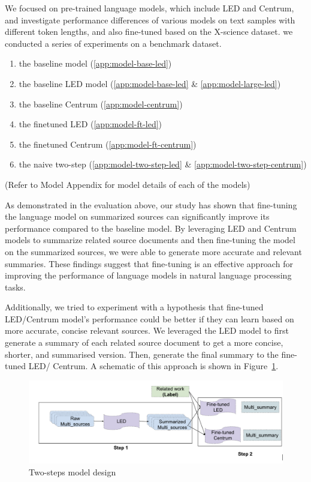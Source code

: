 \documentclass[12pt, twocolumn]{article}
\numberwithin{equation}{section}
\begin{document}
We focused on pre-trained language models, which include LED and Centrum, and investigate performance differences of various models on text samples with different token lengths, and also fine-tuned based on the X-science dataset.  we conducted a series of experiments on a benchmark dataset.

\begin{enumerate}
    \item the baseline model (\ref{app:model-base-led})
    \item the baseline LED model (\ref{app:model-base-led} \& \ref{app:model-large-led})
    \item the baseline Centrum (\ref{app:model-centrum})
    \item the finetuned LED (\ref{app:model-ft-led})
    \item the finetuned Centrum (\ref{app:model-ft-centrum})
    \item the naive two-step (\ref{app:model-two-step-led} \& \ref{app:model-two-step-centrum})
\end{enumerate}
(Refer to Model Appendix for model details of each of the models)

As demonstrated in the evaluation above, our study has shown that fine-tuning the language model on summarized sources can significantly improve its performance compared to the baseline model. By leveraging LED and Centrum models to summarize related source documents and then fine-tuning the model on the summarized sources, we were able to generate more accurate and relevant summaries. These findings suggest that fine-tuning is an effective approach for improving the performance of language models in natural language processing tasks.

Additionally, we tried to experiment with a hypothesis that fine-tuned LED/Centrum model's performance could be better if they can learn based on more accurate, concise relevant sources. We leveraged the LED model to first generate a summary of each related source document to get a more concise, shorter, and summarised version. Then, generate the final summary to the fine-tuned LED/ Centrum. A schematic of this approach is shown in Figure~\ref{fig:two-steps}.

\begin{figure}
    \includegraphics[width=\textwidth]{two_steps.png}
    \caption{Two-steps model design}
    \label{fig:two-steps}
\end{figure}
\end{document}
